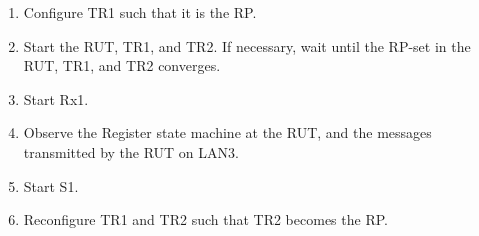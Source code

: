 \documentclass[11pt]{report}
\begin{document}

\begin{enumerate}

  \item Configure TR1 such that it is the RP.

  \item Start the RUT, TR1, and TR2. If necessary, wait until the RP-set in
  the RUT, TR1, and TR2 converges.

  \item Start Rx1.

  \item Observe the Register state machine at the RUT, and the messages
  transmitted by the RUT on LAN3.

  \item Start S1.

  \item Reconfigure TR1 and TR2 such that TR2 becomes the RP.

\end{enumerate}


\end{document}
